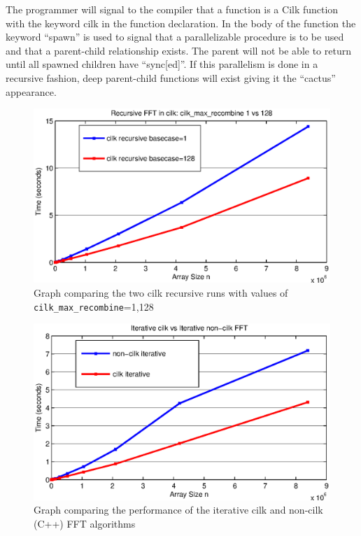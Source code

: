 The programmer will signal to the compiler that a function is a Cilk function with the keyword cilk in the function declaration. In the body of the function the keyword “spawn” is used to signal that a parallelizable procedure is to be used and that a parent-child relationship exists. The parent will not be able to return until all spawned children have “sync[ed]”. If this parallelism is done in a recursive fashion, deep parent-child functions will exist giving it the “cactus” appearance.

\begin{figure}
\center
\includegraphics[scale=0.8]{img/cilk_max_recombine.eps}
\caption{Graph comparing the two cilk recursive runs with values of \texttt{cilk\_max\_recombine}=1,128} 
\label{cilk_max_recombine}
\end{figure}

\begin{figure}
\center
\includegraphics[scale=0.8]{img/iterative_fft.eps}
\caption{Graph comparing the performance of the iterative cilk and non-cilk (C++) FFT algorithms} 
\label{iterative_fft}
\end{figure}


